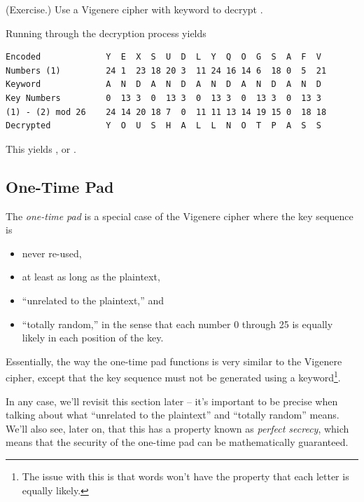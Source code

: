 \documentclass[letterpaper]{article}
\begin{document}
\begin{mdframed}
    (Exercise.) Use a Vigenere cipher with keyword  to decrypt . 

    \begin{mdframed}
        Running through the decryption process yields 
        \begin{mdframed}
\begin{verbatim}
Encoded             Y  E  X  S  U  D  L  Y  Q  O  G  S  A  F  V 
Numbers (1)         24 1  23 18 20 3  11 24 16 14 6  18 0  5  21
Keyword             A  N  D  A  N  D  A  N  D  A  N  D  A  N  D
Key Numbers         0  13 3  0  13 3  0  13 3  0  13 3  0  13 3
(1) - (2) mod 26    24 14 20 18 7  0  11 11 13 14 19 15 0  18 18
Decrypted           Y  O  U  S  H  A  L  L  N  O  T  P  A  S  S 
\end{verbatim}
        \end{mdframed}
        This yields , or .
    \end{mdframed}
\end{mdframed}

\subsection{One-Time Pad}
The \emph{one-time pad} is a special case of the Vigenere cipher where the key sequence is 
\begin{itemize}
    \item never re-used, 
    \item at least as long as the plaintext, 
    \item ``unrelated to the plaintext,'' and 
    \item ``totally random,'' in the sense that each number 0 through 25 is equally likely in each position of the key.
\end{itemize}
Essentially, the way the one-time pad functions is very similar to the Vigenere cipher, except that the key sequence must not be generated using a keyword\footnote{The issue with this is that words won't have the property that each letter is equally likely.}. 

\bigskip 

In any case, we'll revisit this section later -- it's important to be precise when talking about what ``unrelated to the plaintext'' and ``totally random'' means. We'll also see, later on, that this has a property known as \emph{perfect secrecy}, which means that the security of the one-time pad can be mathematically guaranteed. 
\end{document}
